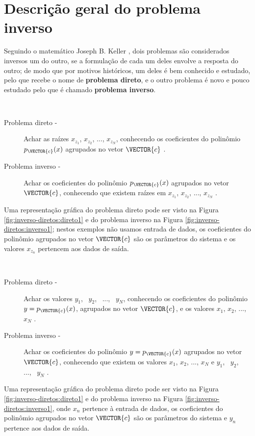 
\section{Descrição geral do problema inverso}

Seguindo o matemático Joseph B. Keller \cite{Keller76}, dois problemas são considerados inversos 
um do outro, se a formulação de cada um deles envolve a resposta do outro;
de modo que por motivos históricos, um deles é bem conhecido e estudado,
pelo que recebe o nome de \textbf{problema direto}, 
e o outro problema é novo e pouco estudado pelo que é chamado \textbf{problema inverso}.
 
\begin{example}~
\begin{description}
\item[Problema direto -] Achar as raízes $x_{z_1}$, $x_{z_2}$, ..., $x_{z_N}$, 
conhecendo os coeficientes do polinômio $p_{\VECTOR{c}}(x)$ agrupados no vetor $\VECTOR{c}$  \cite{Keller76}.
\item[Problema inverso -] Achar os coeficientes do polinômio $p_{\VECTOR{c}}(x)$ agrupados no vetor $\VECTOR{c}$, 
conhecendo que existem raízes em $x_{z_1}$, $x_{z_2}$, ..., $x_{z_N}$ \cite{Keller76}.
\end{description}
Uma representação gráfica do problema direto pode ser visto na Figura \ref{fig:inverso-diretos:direto1}
e do problema inverso na Figura \ref{fig:inverso-diretos:inverso1};
nestos exemplos não usamos entrada de dados, 
os coeficientes do polinômio agrupados no vetor $\VECTOR{c}$ são os parâmetros do sistema e 
os valores $x_{z_n}$ pertencem aos dados de saída.
\end{example}

\begin{example}~
\begin{description}
\item[Problema direto -] Achar os valores $y_1$,~ $y_2$,~ ...,~ $y_N$, 
conhecendo os coeficientes do polinômio $y=p_{\VECTOR{c}}(x)$, agrupados no vetor $\VECTOR{c}$, e
os valores $x_1$, $x_2$, ..., $x_N$ \cite{Keller76}.
\item[Problema inverso -] Achar os coeficientes do polinômio $y=p_{\VECTOR{c}}(x)$ agrupados no vetor $\VECTOR{c}$, 
conhecendo que existem os valores $x_1$, $x_2$, ..., $x_N$ e 
$y_1$,~ $y_2$,~ ...,~ $y_N$  \cite{Keller76}.
\end{description}
Uma representação gráfica do problema direto pode ser visto na Figura \ref{fig:inverso-diretos:direto1}
e do problema inverso na Figura \ref{fig:inverso-diretos:inverso1}, 
onde $x_n$ pertence à entrada de dados, 
os coeficientes do polinômio agrupados no vetor $\VECTOR{c}$ são os parâmetros do sistema e $y_n$ pertence aos dados de saída.
\end{example}


